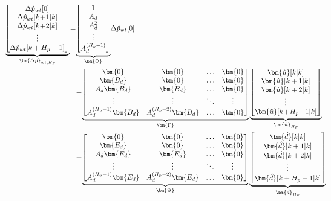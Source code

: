 \begin{align}\hspace{-0.8cm}
\underbrace{\begin{bmatrix}
\Delta \hat p_{wt}[0] \\
\Delta \hat p_{wt}[k\!+\!1|k] \\ 
\Delta \hat p_{wt}[k\!+\!2|k]\\ 
\vdots \\ 
\Delta \hat p_{wt}[k+H_p-1]\\ 
\end{bmatrix}}_{\bm{\Delta \hat{p}}_{wt,Hp}}
\!=\!
&\underbrace{\begin{bmatrix}
1 \\
A_d \\ 
A_d^2\\ 
\vdots \\ 
A_d^{(H_p-1)}\\ 
\end{bmatrix}}_{\bm{\Phi}}
\! \Delta \hat{p}_{wt}[0]\!\\&+\!\nonumber
\underbrace{\begin{bmatrix}
 \bm{0}        & \bm{0}                &\hdots & \bm{0}\\ 
 \bm{B_d}         & \bm{0}                &\hdots & \bm{0}\\ 
 A_d\bm{B_d}      &  \bm{B_d}             &\hdots & \bm{0}\\ 
\vdots            &\vdots                 &\ddots  & \vdots\\ 
 A_d^{(H_p-1)}\bm{B_d}& A_d^{(H_p-2)}\bm{B_d}   &\hdots & \bm{0}\end{bmatrix}}_{\bm{\Gamma}}
\underbrace{\begin{bmatrix}
 \bm{\hat{u}}[k|k] \\ 
 \bm{\hat{u}}[k+1|k]\\ 
  \bm{\hat{u}}[k+2|k]\\ 
\vdots \\ 
 \bm{\hat{u}}[k\!+\!H_p\!-\!1|k]\\ 
\end{bmatrix}}_{\bm{\hat{u}}_{Hp}} \\
\!\!&+\! 
\underbrace{\begin{bmatrix}
\bm{0} & \bm{0} & \hdots  & \bm{0}\\ 
 \bm{E_d}& \bm{0} & \hdots  & \bm{0}\\ 
 A_d\bm{E_d}&  \bm{E_d}& \hdots & \bm{0}\\ 
\vdots &\vdots  & \ddots  & \vdots\\ 
 A_d^{(H_p-1)}\bm{E_d}& A_d^{(H_p-2)}\bm{E_d}  & \hdots  & \bm{0}
\end{bmatrix}}_{\bm{\Psi}}
\underbrace{\begin{bmatrix}
 \bm{\hat{d}}[k|k] \\ 
 \bm{\hat{d}}[k+1|k]\\ 
  \bm{\hat{d}}[k+2|k]\\ 
\vdots \\ 
 \bm{\hat{d}}[k+H_p-1|k]\\ 
\end{bmatrix}}_{\bm{\hat{d}}_{Hp}} 
\end{align}


